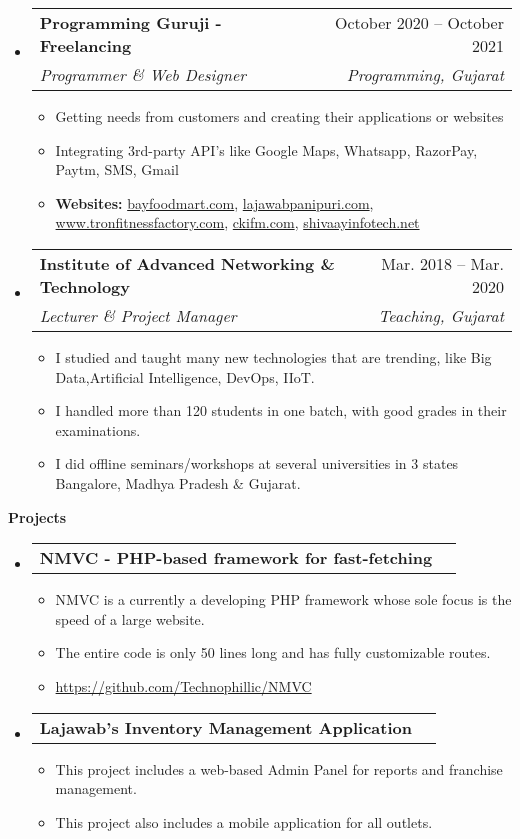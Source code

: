 \documentclass[letterpaper,12pt]{article}[leftmargin=*]
\makeatletter
\def \entryspacing {-0pt}
\renewcommand{\section}[2]{\vspace{5pt}
  \colorbox{secondary}{\color{white}\raggedbottom\normalsize\textbf{{#1}{\hspace{7pt}#2}}}
}
\newcommand{\resumeEntryStart}{\begin{itemize}[leftmargin=2.5mm]}
\newcommand{\resumeEntryEnd}{\end{itemize}\vspace{\entryspacing}}
\newcommand{\resumeItemListStart}{\begin{itemize}[leftmargin=4.5mm]}
\newcommand{\resumeItemListEnd}{\end{itemize}}
\newcommand{\resumeItem}[1]{
  \item\small{
    {#1 \vspace{-2pt}}
  }
}
\newcommand{\resumeEntryTSDL}[4]{
  \vspace{-1pt}\item[]
    \begin{tabularx}{0.97\textwidth}{X@{\hspace{60pt}}r}
      \textbf{\color{primary}#1} & {\firabook\color{accent}\small#2} \\
      \textit{\color{accent}\small#3} & \textit{\color{accent}\small#4} \\
    \end{tabularx}\vspace{-6pt}
}
\newcommand{\resumeEntryTD}[2]{
  \vspace{-1pt}\item[]
    \begin{tabularx}{0.97\textwidth}{X@{\hspace{60pt}}r}
      \textbf{\color{primary}#1} & {\firabook\color{accent}\small#2} \\
    \end{tabularx}\vspace{-6pt}
}
\makeatother
\begin{document}
  \resumeEntryStart
    \resumeEntryTSDL
      {Programming Guruji - Freelancing}{October 2020 -- October 2021}
      {Programmer \& Web Designer}{Programming, Gujarat}
    \resumeItemListStart
      \resumeItem {Getting needs from customers and creating their applications or websites}
      \resumeItem {Integrating 3rd-party API's like Google Maps, Whatsapp, RazorPay, Paytm, SMS, Gmail}
      \resumeItem {{\bf Websites:} \url{bayfoodmart.com}, \space \url{lajawabpanipuri.com}, \space \url{www.tronfitnessfactory.com}, \linebreak 
      \url{ckifm.com}, \space \url{shivaayinfotech.net}}
    \resumeItemListEnd
  \resumeEntryEnd

  \resumeEntryStart
    \resumeEntryTSDL
      {Institute of Advanced Networking \& Technology}{Mar. 2018 -- Mar. 2020}
      {Lecturer \& Project Manager}{Teaching, Gujarat}
    \resumeItemListStart
      \resumeItem { I studied and taught many new technologies that are trending, like Big Data,\linebreak Artificial Intelligence, DevOps, IIoT.}
      \resumeItem{I handled more than 120 students in one batch, with good grades in their examinations.}
      \resumeItem{I did offline seminars/workshops at several universities in 3 states Bangalore, Madhya Pradesh \& Gujarat.}
    \resumeItemListEnd
  \resumeEntryEnd


\section{\faFlask}{Projects}

  \resumeEntryStart
    \resumeEntryTD
      {NMVC - PHP-based framework for fast-fetching}{}
    \resumeItemListStart
      \resumeItem {NMVC is a currently a developing PHP framework whose sole focus is the speed of a large website.}
      \resumeItem {The entire code is only 50 lines long and has fully customizable routes.}
      \resumeItem {\url{https://github.com/Technophillic/NMVC}}
    \resumeItemListEnd
  \resumeEntryEnd

  \resumeEntryStart
    \resumeEntryTD
      {Lajawab's Inventory Management Application}{}
    \resumeItemListStart
      \resumeItem {This project includes a web-based Admin Panel for reports and franchise management.}
      \resumeItem {This project also includes a mobile application for all outlets.}
    \resumeItemListEnd
  \resumeEntryEnd
\end{document}

